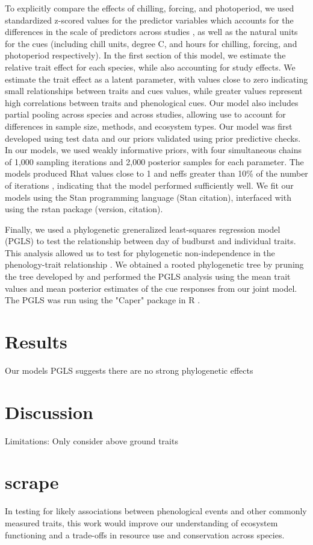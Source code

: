 \documentclass{article}\usepackage[]{graphicx}\usepackage[]{color}
\begin{document}
To explicitly compare the effects of chilling, forcing, and photoperiod, we used standardized z-scored values for the predictor variables which accounts for the differences in the scale of predictors across studies \citep{Gelman2006}, as well as the natural units for the cues (including chill units, degree C, and hours for chilling, forcing, and photoperiod respectively). In the first section of this model, we estimate the relative trait effect for each species, while also accounting for study effects. We estimate the trait effect as a latent parameter, with values close to zero indicating small relationships between traits and cues values, while greater values represent high correlations between traits and phenological cues. Our model also includes partial pooling across species and across studies, allowing use to account for differences in sample size, methods, and ecosystem types. Our model was first developed using test data and our priors validated using prior predictive checks. In our models, we used weakly informative priors, with four simultaneous chains of 1,000 sampling iterations and 2,000 posterior samples for each parameter. The models produced Rhat values close to 1 and neffs greater than 10\% of the number of iterations %
, indicating that the model performed sufficiently well.  We fit our models using the Stan programming language (Stan citation), interfaced with using the rstan package (version, citation).

Finally, we used a phylogenetic greneralized least-squares regression model (PGLS) to test the relationship between day of budburst and individual traits. This analysis allowed us to test for phylogenetic non-independence in the phenology-trait relationship \citep{Freckleton2002}. We obtained a rooted phylogenetic tree by pruning the tree developed by \citep{Smith2018} and performed the PGLS analysis using the mean trait values and mean posterior estimates of the cue responses from our joint model. The PGLS was run using the "Caper" package in R \citep{Orne2013}.

\section{Results}

Our models
PGLS suggests there are no strong phylogenetic effects

 \section{Discussion}


Limitations: Only consider above ground traits



\pagebreak
% 


\section{scrape}
In testing for likely associations between phenological events and other commonly measured traits, this work would improve our understanding of ecosystem functioning and a trade-offs in resource use and conservation across species.  
\end{document}
